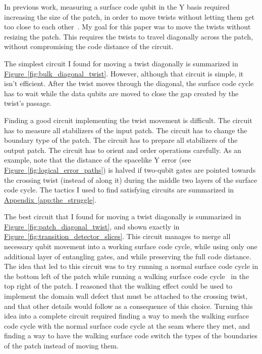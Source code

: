 \documentclass[onecolumn,unpublished,a4paper]{quantumarticle}
\theoremstyle{definition}
\theoremstyle{definition}
\theoremstyle{definition}
\DeclareRobustCommand{\app}[1]{\hyperref[app:#1]{Appendix~\ref*{app:#1}}}
\newcommand{\fig}[1]{\hyperref[fig:#1]{Figure~\ref*{fig:#1}}}
\begin{document}
In previous work, measuring a surface code qubit in the Y basis required increasing the size of the patch, in order to move twists without letting them get too close to each other~\cite{brown2017surfacetwists,bombin2021logical,chamberland2022universal}.
My goal for this paper was to move the twists without resizing the patch.
This requires the twists to travel diagonally across the patch, without compromising the code distance of the circuit.

The simplest circuit I found for moving a twist diagonally is summarized in \fig{bulk_diagonal_twist}.
However, although that circuit is simple, it isn't efficient.
After the twist moves through the diagonal, the surface code cycle has to wait while the data qubits are moved to close the gap created by the twist's passage.

Finding a good circuit implementing the twist movement is difficult.
The circuit has to measure all stabilizers of the input patch.
The circuit has to change the boundary type of the patch.
The circuit has to prepare all stabilizers of the output patch.
The circuit has to orient and order operations carefully.
As an example, note that the distance of the spacelike Y error (see \fig{logical_error_paths}) is halved if two-qubit gates are pointed towards the crossing twist (instead of along it) during the middle two layers of the surface code cycle.
The tactics I used to find satisfying circuits are summarized in \app{the_struggle}.

The best circuit that I found for moving a twist diagonally is summarized in \fig{patch_diagonal_twist}, and shown exactly in \fig{transition_detector_slices}.
This circuit manages to merge all necessary qubit movement into a working surface code cycle, while using only one additional layer of entangling gates, and while preserving the full code distance.
The idea that led to this circuit was to try running a normal surface code cycle in the bottom left of the patch while running a walking surface code cycle~\cite{mcewenmidoutsurfaces2023} in the top right of the patch.
I reasoned that the walking effect could be used to implement the domain wall defect that must be attached to the crossing twist, and that other details would follow as a consequence of this choice.
Turning this idea into a complete circuit required finding a way to mesh the walking surface code cycle with the normal surface code cycle at the seam where they met, and finding a way to have the walking surface code switch the types of the boundaries of the patch instead of moving them.
\end{document}
